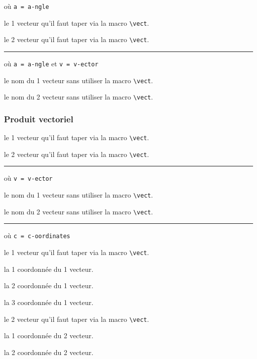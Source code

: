 \documentclass[12pt,a4paper]{article}
\newcommand\env[1]{\texttt{#1}}
\newcommand\macro[1]{\env{\textbackslash{}#1}}
\theoremstyle{definition}
\newcommand\separation{
	\medskip
	\hfill\rule{0.5\textwidth}{0.75pt}\hfill
	\medskip
}
\begin{document}
 où \quad \verb&a = a-ngle&


 le 1\ier{} vecteur qu'il faut taper via la macro \macro{vect}.

 le 2\ieme{} vecteur qu'il faut taper via la macro \macro{vect}.


\separation


 où \quad \verb&a = a-ngle& et \verb+v = v-ector+

 le nom du 1\ier{} vecteur sans utiliser la macro \macro{vect}.

 le nom du 2\ieme{} vecteur sans utiliser la macro \macro{vect}.





\subsubsection{Produit vectoriel}



 le 1\ier{} vecteur qu'il faut taper via la macro \macro{vect}.

 le 2\ieme{} vecteur qu'il faut taper via la macro \macro{vect}.


\separation


 où \quad \verb+v = v-ector+

 le nom du 1\ier{} vecteur sans utiliser la macro \macro{vect}.

 le nom du 2\ieme{} vecteur sans utiliser la macro \macro{vect}.


\separation


  où \quad \verb+c = c-oordinates+

 le 1\ier{} vecteur qu'il faut taper via la macro \macro{vect}.

 la 1\iere{} coordonnée du 1\ier{} vecteur.

 la 2\ieme{} coordonnée du 1\ier{} vecteur.

 la 3\ieme{} coordonnée du 1\ier{} vecteur.

 le 2\ieme{} vecteur qu'il faut taper via la macro \macro{vect}.

 la 1\iere{} coordonnée du 2\ieme{} vecteur.

 la 2\ieme{} coordonnée du 2\ieme{} vecteur.
\end{document}
